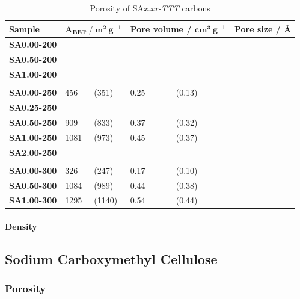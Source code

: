 \begin{table}[h]
    \caption{Porosity of SA\textit{x.xx-TTT} carbons}
    \label{tb:nc_porosity}
    \begin{tabularx}{\textwidth}{lllXXll}
    \toprule
        \textbf{Sample} & \multicolumn{2}{l}{$\mathbf{A_{BET}\ /\ m^2\ g^{-1}}$}  & \multicolumn{2}{l}{\textbf{Pore volume} / $\mathbf{cm^3\ g^{-1}}$} & \multicolumn{2}{l}{\textbf{Pore size / \AA}} \\
    \midrule
        \textbf{SA0.00-200} & & & & & \\
        \textbf{SA0.50-200} & & & & & \\
        \textbf{SA1.00-200} & & & & & \\
        \\
        \textbf{SA0.00-250} & 456 & (351) & 0.25 & (0.13) & \\
        \textbf{SA0.25-250} & & & & & \\
        \textbf{SA0.50-250} & 909 & (833) & 0.37 & (0.32) & \\
        \textbf{SA1.00-250} & 1081 & (973) & 0.45 & (0.37) & \\
        \textbf{SA2.00-250} & & & & & \\
        \\
        \textbf{SA0.00-300} & 326 & (247) & 0.17 & (0.10) & \\
        \textbf{SA0.50-300} & 1084 & (989) & 0.44 & (0.38) & \\
        \textbf{SA1.00-300} & 1295 & (1140) & 0.54 & (0.44) & \\
    \bottomrule
    \end{tabularx}
\end{table}

\paragraph{Density}

\subsection{Sodium Carboxymethyl Cellulose}

\subsubsection{Porosity}

